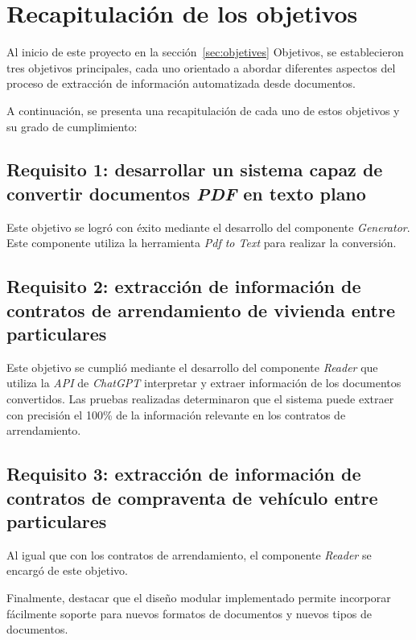 \section{Recapitulación de los objetivos}

Al inicio de este proyecto en la sección~\ref{sec:objetives} Objetivos, se establecieron tres objetivos principales,
cada uno orientado a abordar diferentes aspectos del proceso de extracción de información automatizada desde documentos.

A continuación, se presenta una recapitulación de cada uno de estos objetivos y su grado de cumplimiento:

\subsection*{Requisito 1: desarrollar un sistema capaz de convertir documentos \textit{PDF} en texto plano}

Este objetivo se logró con éxito mediante el desarrollo del componente \textit{Generator}.
Este componente utiliza la herramienta \textit{Pdf to Text} para realizar la conversión.

\subsection*{Requisito 2: extracción de información de contratos de arrendamiento de vivienda entre particulares}

Este objetivo se cumplió mediante el desarrollo del componente \textit{Reader} que utiliza la \textit{API}
de \textit{ChatGPT} interpretar y extraer información de los documentos convertidos.
Las pruebas realizadas determinaron que el sistema puede extraer con precisión el 100\% de la información relevante
en los contratos de arrendamiento.

\subsection*{Requisito 3: extracción de información de contratos de compraventa de vehículo entre particulares}

Al igual que con los contratos de arrendamiento, el componente \textit{Reader} se encargó de este objetivo.

Finalmente, destacar que el diseño modular implementado permite incorporar fácilmente soporte para nuevos formatos de
documentos y nuevos tipos de documentos.